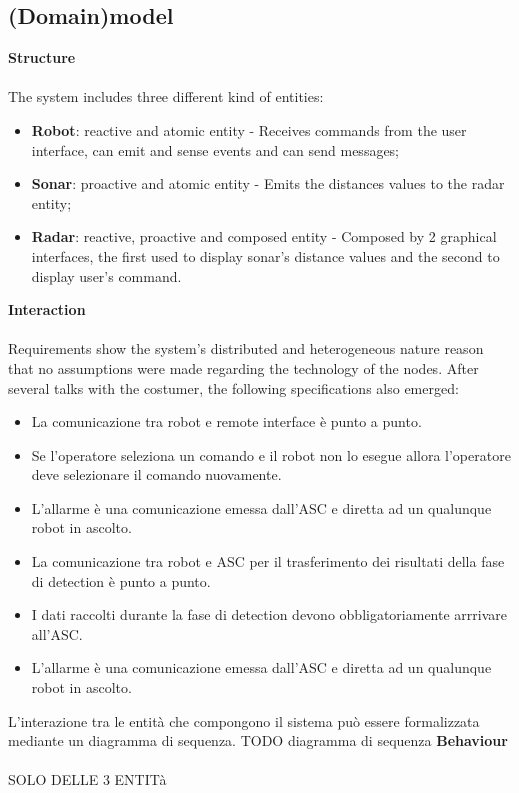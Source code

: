 \subsection{(Domain)model}
\textbf{Structure} \\\\
The system includes three different kind of entities:
\begin{itemize}
	\item \textbf{Robot}: reactive and atomic entity - Receives commands from the user interface, can emit and sense events and can send messages;
	\item \textbf{Sonar}: proactive and atomic entity - Emits the distances values to the radar entity;
	\item \textbf{Radar}: reactive, proactive and composed entity - Composed by 2 graphical interfaces, the first used to display sonar's distance values and the second to display user's command.
\end{itemize}
\textbf{Interaction} \\\\
Requirements show the system's distributed and heterogeneous nature reason that no assumptions were made regarding the technology of the nodes. After several talks with the costumer, the following specifications also emerged: 
\begin{itemize}
	\item La comunicazione tra robot e remote interface è punto a punto.
	\item Se l’operatore seleziona un comando e il robot non lo esegue allora l’operatore deve selezionare il comando nuovamente.
	\item L’allarme è una comunicazione emessa dall’ASC e diretta ad un qualunque robot in ascolto.
	\item La comunicazione tra robot e ASC per il trasferimento dei risultati della fase di detection è punto a punto.
	\item I dati raccolti durante la fase di detection devono obbligatoriamente arrrivare all’ASC.
	\item L’allarme è una comunicazione emessa dall’ASC e diretta ad un qualunque robot in ascolto.
\end{itemize}
L’interazione tra le entità che compongono il sistema può essere formalizzata mediante un diagramma di sequenza.
TODO diagramma di sequenza
\textbf{Behaviour} \\\\
SOLO DELLE 3 ENTITà